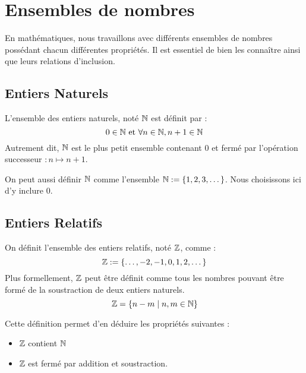
\section{Ensembles de nombres}

En mathématiques, nous travaillons avec différents ensembles de nombres possédant chacun différentes 
propriétés. Il est essentiel de bien les connaître ainsi que leurs relations d'inclusion. 

\subsection{Entiers Naturels}

\begin{definition}
    L'ensemble des entiers naturels, noté $\mathbb{N}$ est définit par : 
        \[ 0 \in \mathbb{N} \text{ et } \forall n \in \mathbb{N}, n + 1 \in \mathbb{N} \] 
    Autrement dit, $\mathbb{N}$ est le plus petit ensemble contenant $0$ et fermé par l'opération successeur $ : n \mapsto n+1$. 
\end{definition}

On peut aussi définir $\mathbb{N}$ comme l'ensemble $\mathbb{N} := \{1, 2, 3, \dots\}$. Nous choisissons ici d'y inclure $0$. 

\subsection{Entiers Relatifs}

\begin{definition}
    On définit l'ensemble des entiers relatifs, noté $\mathbb{Z}$, comme : 
        \[ \mathbb{Z} := \{\dots, -2, -1, 0, 1, 2, \dots\} \]
    Plus formellement, $\mathbb{Z}$ peut être définit comme tous les nombres pouvant être formé de la soustraction 
    de deux entiers naturels. 
        \[ \mathbb{Z} = \{n - m \; | \; n,m \in \mathbb{N}\} \] 
\end{definition}

\begin{proposition}
    Cette définition permet d'en déduire les propriétés suivantes : 
    \begin{itemize}
        \item $\mathbb{Z}$ contient $\mathbb{N}$ 
        \item $\mathbb{Z}$ est fermé par addition et soustraction. 
    \end{itemize}
\end{proposition}

